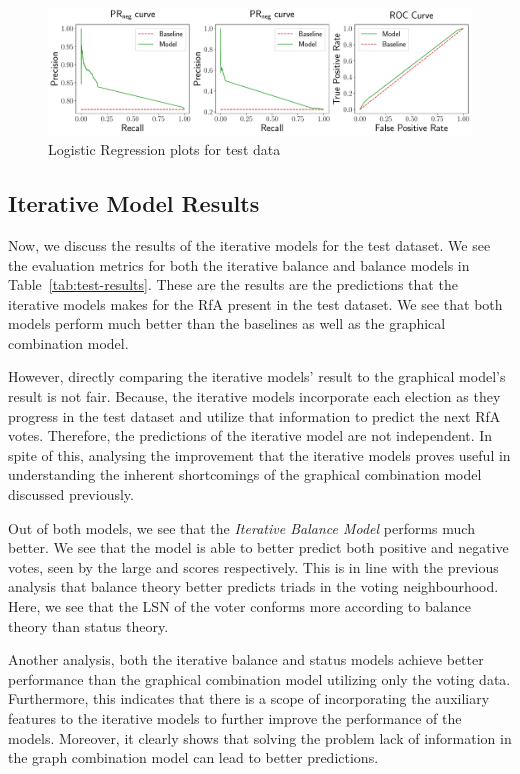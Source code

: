\begin{figure}[htp]
    \centering
    \includegraphics[width=\textwidth]{images/Logisitc Regression_test.pdf}
    \caption{Logistic Regression plots for test data}
    \label{fig:lr-test-plots}
\end{figure}

\subsection{Iterative Model Results}
Now, we discuss the results of the iterative models for the test dataset.
We see the evaluation metrics for both the iterative balance and balance models in Table~\ref{tab:test-results}.
These are the results are the predictions that the iterative models makes for the RfA present in the test dataset. 
We see that both models perform much better than the baselines as well as the graphical combination model.

However, directly comparing the iterative models' result to the graphical model's result is not fair.
Because, the iterative models incorporate each election as they progress in the test dataset and utilize that information to predict the next RfA votes.
Therefore, the predictions of the iterative model are not independent.
In spite of this, analysing the improvement that the iterative models proves useful in understanding the inherent shortcomings of the graphical combination model discussed previously.

Out of both models, we see that the \textit{Iterative Balance Model} performs much better.
We see that the model is able to better predict both positive and negative votes, seen by the large \aucposPR and \aucnegPR scores respectively.
This is in line with the previous analysis that balance theory better predicts triads in the voting neighbourhood.
Here, we see that the LSN of the voter conforms more according to balance theory than status theory. 

Another analysis, both the iterative balance and status models achieve better performance than the graphical combination model utilizing only the voting data.
Furthermore, this indicates that there is a scope of incorporating the auxiliary features to the iterative models to further improve the performance of the models.
Moreover, it clearly shows that solving the problem lack of information in the graph combination model can lead to better predictions.

